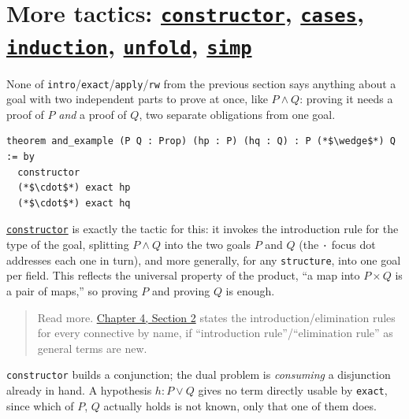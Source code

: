 \section{\texorpdfstring{More tactics: \href{https://lean-lang.org/doc/reference/latest/Tactic-Proofs/Tactic-Reference/}{\texttt{constructor}}, \href{https://lean-lang.org/doc/reference/latest/Tactic-Proofs/Tactic-Reference/}{\texttt{cases}}, \href{https://lean-lang.org/doc/reference/latest/Tactic-Proofs/Tactic-Reference/}{\texttt{induction}}, \href{https://lean-lang.org/doc/reference/latest/Tactic-Proofs/Tactic-Reference/}{\texttt{unfold}}, \href{https://lean-lang.org/doc/reference/latest/Tactic-Proofs/Tactic-Reference/}{\texttt{simp}}}{More tactics: constructor, cases, induction, unfold, simp}}\label{sec:05-tactics:04-more-tactics:1}

None of \texttt{intro}/\texttt{exact}/\texttt{apply}/\texttt{rw} from the previous section says anything about a goal with two independent parts to prove at once, like \(P \wedge Q\): proving it needs a proof of \(P\) \emph{and} a proof of \(Q\), two separate obligations from one goal.

\begin{lstlisting}
theorem and_example (P Q : Prop) (hp : P) (hq : Q) : P (*$\wedge$*) Q := by
  constructor
  (*$\cdot$*) exact hp
  (*$\cdot$*) exact hq
\end{lstlisting}

\href{https://lean-lang.org/doc/reference/latest/Tactic-Proofs/Tactic-Reference/}{\texttt{constructor}} is exactly the tactic for this: it invokes the introduction rule for the type of the goal, splitting \(P \wedge Q\) into the two goals \(P\) and \(Q\) (the \texttt{·} focus dot addresses each one in turn), and more generally, for any \texttt{structure}, into one goal per field. This reflects the universal property of the product, ``a map into \(P \times Q\) is a pair of maps,'' so proving \(P\) and proving \(Q\) is enough.

\begin{quote}
Read more. \hyperref[sec:04-propositions-and-proofs:02-logic-recap:1]{Chapter 4, Section 2} states the introduction/elimination rules for every connective by name, if ``introduction rule''/``elimination rule'' as general terms are new.
\end{quote}

\texttt{constructor} builds a conjunction; the dual problem is \emph{consuming} a disjunction already in hand. A hypothesis \(h : P \vee Q\) gives no term directly usable by \texttt{exact}, since which of \(P\), \(Q\) actually holds is not known, only that one of them does.


